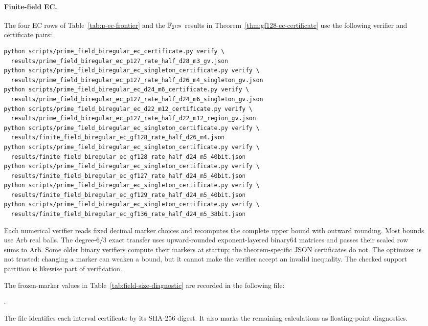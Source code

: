 \paragraph{Finite-field EC.}
The four EC rows of Table~\ref{tab:p-ec-frontier} and the
$\mathbb F_{2^{128}}$ results in Theorem~\ref{thm:gf128-ec-certificate} use the
following verifier and certificate pairs:
{\small
\begin{verbatim}
python scripts/prime_field_biregular_ec_certificate.py verify \
  results/prime_field_biregular_ec_p127_rate_half_d28_m3_gv.json
python scripts/prime_field_biregular_ec_singleton_certificate.py verify \
  results/prime_field_biregular_ec_p127_rate_half_d26_m4_singleton_gv.json
python scripts/prime_field_biregular_ec_d24_m6_certificate.py verify \
  results/prime_field_biregular_ec_p127_rate_half_d24_m6_singleton_gv.json
python scripts/prime_field_biregular_ec_d22_m12_certificate.py verify \
  results/prime_field_biregular_ec_p127_rate_half_d22_m12_region_gv.json
python scripts/prime_field_biregular_ec_singleton_certificate.py verify \
  results/finite_field_biregular_ec_gf128_rate_half_d26_m4.json
python scripts/prime_field_biregular_ec_singleton_certificate.py verify \
  results/finite_field_biregular_ec_gf128_rate_half_d24_m5_40bit.json
python scripts/prime_field_biregular_ec_singleton_certificate.py verify \
  results/finite_field_biregular_ec_gf127_rate_half_d24_m5_40bit.json
python scripts/prime_field_biregular_ec_singleton_certificate.py verify \
  results/finite_field_biregular_ec_gf129_rate_half_d24_m5_40bit.json
python scripts/prime_field_biregular_ec_singleton_certificate.py verify \
  results/finite_field_biregular_ec_gf136_rate_half_d24_m5_38bit.json
\end{verbatim}
}

Each numerical verifier reads fixed decimal marker choices and recomputes the
complete upper bound with outward rounding.  Most bounds use Arb real balls.
The degree-$6/3$ exact transfer uses upward-rounded exponent-layered binary64
matrices and passes their scaled row sums to Arb.  Some older binary verifiers
compute their markers at startup; the theorem-specific JSON certificates do
not.  The optimizer is not trusted: changing a marker can weaken a bound, but
it cannot make the verifier accept an invalid inequality.  The checked
support partition is likewise part of verification.

The frozen-marker values in Table~\ref{tab:field-size-diagnostic} are recorded
in the following file:
\begin{center}
\small
{}.
\end{center}
The file identifies each interval certificate by its SHA-256 digest.  It also
marks the remaining calculations as floating-point diagnostics.

